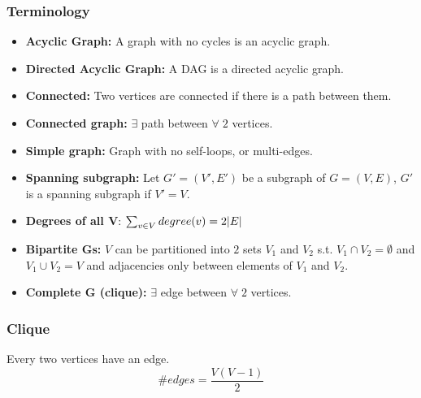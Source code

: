     \subsubsection{Terminology}
    \begin{terminology}
        \begin{itemize}
            \item \textbf{Acyclic Graph:} A graph with no cycles is an acyclic graph.
            \item \textbf{Directed Acyclic Graph:} A DAG is a directed acyclic graph.

            \item \textbf{Connected:} Two vertices are connected if there is a path between them.
            \item \textbf{Connected graph:} $\exists$ path between $\forall \; 2$ vertices. 
            
            \item \textbf{Simple graph:} Graph with no self-loops, or multi-edges.
            \item \textbf{Spanning subgraph:} Let $G' = (V',E')$ be a subgraph of $G=(V,E)$, $G'$ is a spanning subgraph if $V'=V$.

            \item \textbf{Degrees of all V}: $\sum_{v\in V} degree(v) = 2\abs{E}$

            \item \textbf{Bipartite Gs:} $V$ can be partitioned into $2$ sets $V_1$ and $V_2$ s.t. $V_1 \cap V_2 = \emptyset$ and $V_1 \cup V_2 = V$ and adjacencies only between elements of $V_1$ and $V_2$.

            \item \textbf{Complete G (clique):} $\exists$ edge between $\forall \; 2$ vertices. 
        \end{itemize}
    \end{terminology}

    \subsubsection{Clique}
    \begin{definition}
        Every two vertices have an edge. 
        \begin{equation*}
            \# edges = \frac{V(V-1)}{2}
        \end{equation*}
    \end{definition}

